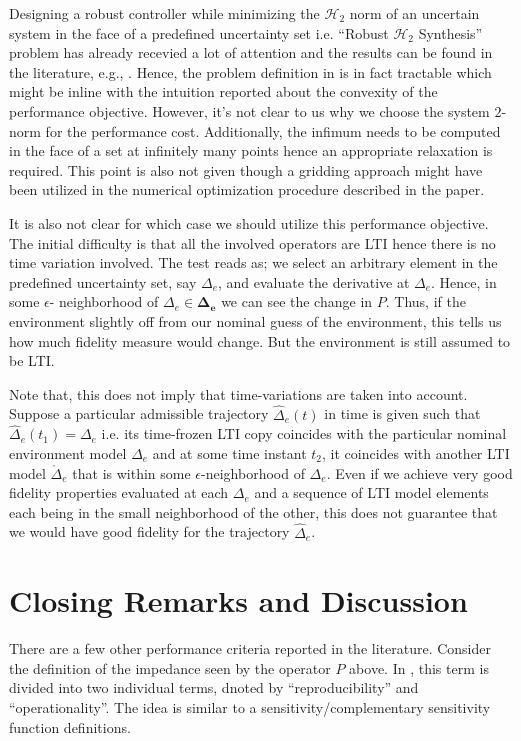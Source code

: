 Designing a robust controller while minimizing the $\mathcal{H}_2$ norm of an uncertain system in the face of a predefined 
uncertainty set i.e. \enquote{Robust $\mathcal{H}_2$ Synthesis} problem has already recevied a lot of attention and 
the results can be found in the literature, e.g., \cite{dullerud}. Hence, the problem definition in \cite{cavusoglu} is 
in fact tractable which might be inline with the intuition reported about the convexity of the performance objective. However, 
it's not clear to us why we choose the system $2$-norm for the performance cost. Additionally, the infimum needs to be 
computed in the face of a set at infinitely many points hence an appropriate relaxation is required. This point is also not 
given though a gridding approach might have been utilized in the numerical optimization procedure described in the paper.

It is also not clear for which case we should utilize this performance objective. The initial difficulty is that all the 
involved operators are LTI hence there is no time variation involved. The test reads as; we select an arbitrary element 
in the predefined uncertainty set, say $\Delta_e$, and evaluate the derivative at $\Delta_e$. Hence, in some $\epsilon$-
neighborhood of $\Delta_e\in\bm{\Delta_e}$ we can see the change in $P$. Thus, if the environment slightly off from our 
nominal guess of the environment, this tells us how much fidelity measure would change. But the environment is still 
assumed to be LTI.


Note that, this does not imply that time-variations are taken into account. Suppose a particular admissible trajectory
$\hat{\Delta}_e(t)$ in time is given such that $\hat{\Delta}_e(t_1)=\Delta_e$ i.e. its time-frozen LTI copy coincides 
with the particular nominal environment model $\Delta_e$ and at some time instant $t_2$, it  coincides with another 
LTI model $\mathring\Delta_e$ that is within some $\epsilon$-neighborhood of $\Delta_e$. Even if we achieve very good 
fidelity properties evaluated at each $\Delta_e$ and a sequence of LTI model elements each being in the small neighborhood 
of the other, this does not guarantee that we would have good fidelity for the trajectory $\hat{\Delta}_e$.


\section{Closing Remarks and Discussion}
There are a few other performance criteria reported in the literature. Consider the definition of the impedance seen by 
the operator $P$ above. In \cite{katsura}, this term is divided into two individual terms, dnoted by 
\enquote{reproducibility} and \enquote{operationality}. The idea is similar to a sensitivity/complementary sensitivity 
function definitions. 


